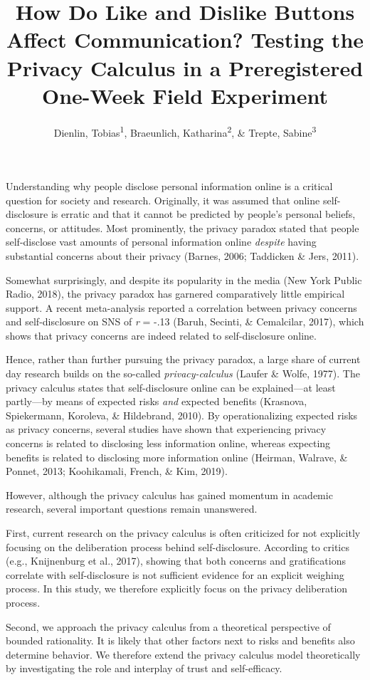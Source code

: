 \documentclass[
  english,
  man,floatsintext]{apa6}
\title{How Do Like and Dislike Buttons Affect Communication? Testing the Privacy Calculus in a Preregistered One-Week Field Experiment}
\author{Dienlin, Tobias\textsuperscript{1}, Braeunlich, Katharina\textsuperscript{2}, \& Trepte, Sabine\textsuperscript{3}}
\date{}
\affiliation{\vspace{0.5cm}\textsuperscript{1} University of Vienna\\\textsuperscript{2} University of Koblenz-Landau\\\textsuperscript{3} University of Hohenheim}
\begin{document}
\maketitle

Understanding why people disclose personal information online is a critical question for society and research.
Originally, it was assumed that online self-disclosure is erratic and that it cannot be predicted by people's personal beliefs, concerns, or attitudes.
Most prominently, the privacy paradox stated that people self-disclose vast amounts of personal information online \emph{despite} having substantial concerns about their privacy (Barnes, 2006; Taddicken \& Jers, 2011).

Somewhat surprisingly, and despite its popularity in the media (New York Public Radio, 2018), the privacy paradox has garnered comparatively little empirical support.
A recent meta-analysis reported a correlation between privacy concerns and self-disclosure on SNS of \emph{r} = -.13 (Baruh, Secinti, \& Cemalcilar, 2017), which shows that privacy concerns are indeed related to self-disclosure online.

Hence, rather than further pursuing the privacy paradox, a large share of current day research builds on the so-called \emph{privacy-calculus} (Laufer \& Wolfe, 1977).
The privacy calculus states that self-disclosure online can be explained---at least partly---by means of expected risks \emph{and} expected benefits (Krasnova, Spiekermann, Koroleva, \& Hildebrand, 2010).
By operationalizing expected risks as privacy concerns, several studies have shown that experiencing privacy concerns is related to disclosing less information online, whereas expecting benefits is related to disclosing more information online (Heirman, Walrave, \& Ponnet, 2013; Koohikamali, French, \& Kim, 2019).

However, although the privacy calculus has gained momentum in academic research, several important questions remain unanswered.

First, current research on the privacy calculus is often criticized for not explicitly focusing on the deliberation process behind self-disclosure.
According to critics (e.g., Knijnenburg et al., 2017), showing that both concerns and gratifications correlate with self-disclosure is not sufficient evidence for an explicit weighing process.
In this study, we therefore explicitly focus on the privacy deliberation process.

Second, we approach the privacy calculus from a theoretical perspective of bounded rationality.
It is likely that other factors next to risks and benefits also determine behavior.
We therefore extend the privacy calculus model theoretically by investigating the role and interplay of trust and self-efficacy.
\end{document}
